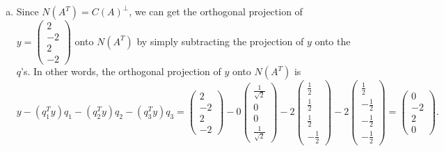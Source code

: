 \documentclass[12pt]{article}
\begin{document}
\begin{enumerate}[1.]
\begin{enumerate}[(a)]
        \item Since $N(A^T) = C(A)^{\perp}$, we can get the orthogonal projection of $y = \begin{pmatrix} 2 \\ -2 \\ 2 \\ -2 \end{pmatrix}$ onto $N(A^T)$ by simply subtracting the projection of $y$ onto the $q$'s. In other words, the orthogonal projection of $y$ onto $N(A^T)$ is
        \[
        y - (q_1^T y) q_1 - (q_2^T y) q_2 - (q_3^T y) q_3 =  \begin{pmatrix} 2 \\ -2 \\ 2 \\ -2 \end{pmatrix} -0\begin{pmatrix} \frac{1}{\sqrt{2}} \\ 0 \\ 0 \\ \frac{1}{\sqrt{2}} \end{pmatrix} - 2\begin{pmatrix} \frac{1}{2} \\ \frac{1}{2} \\ \frac{1}{2} \\ -\frac{1}{2} \end{pmatrix} - 2\begin{pmatrix} \frac{1}{2} \\ -\frac{1}{2} \\ -\frac{1}{2} \\ -\frac{1}{2} \end{pmatrix} = \boxed{\begin{pmatrix} 0 \\ -2 \\ 2 \\ 0 \end{pmatrix}}.
        \]

\end{enumerate}
\end{enumerate}
\end{document}
